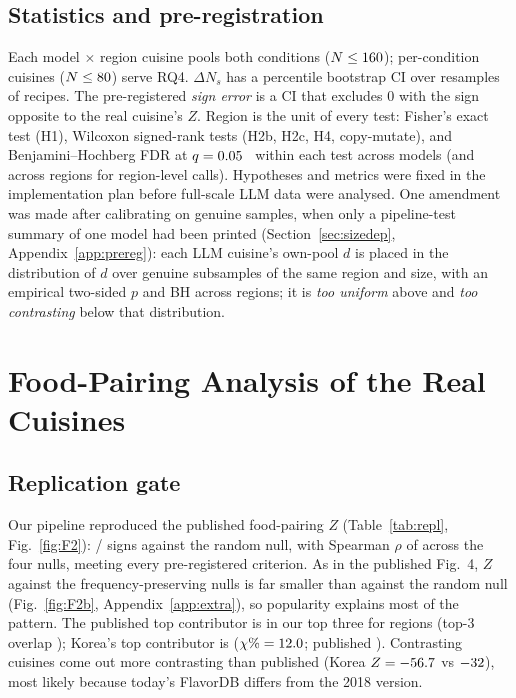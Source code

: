 \documentclass[conference]{IEEEtran}
\newcommand{\dNs}{\Delta N_s}
\begin{document}
\subsection{Statistics and pre-registration}\label{sec:stats}
Each model $\times$ region cuisine pools both conditions ($N\leq160$); per-condition cuisines ($N\leq80$) serve RQ4. $\dNs$ has a percentile bootstrap CI over \NBoot{} resamples of recipes. The pre-registered \emph{sign error} is a CI that excludes 0 with the sign opposite to the real cuisine's $Z$. Region is the unit of every test: Fisher's exact test (H1), Wilcoxon signed-rank tests (H2b, H2c, H4, copy-mutate), and Benjamini--Hochberg FDR at $q=0.05$~\cite{benjamini1995} within each test across models (and across regions for region-level calls). Hypotheses and metrics were fixed in the implementation plan before full-scale LLM data were analysed. One amendment was made after calibrating on genuine samples, when only a pipeline-test summary of one model had been printed (Section~\ref{sec:sizedep}, Appendix~\ref{app:prereg}): each LLM cuisine's own-pool $d$ is placed in the distribution of $d$ over genuine subsamples of the same region and size, with an empirical two-sided $p$ and BH across regions; it is \emph{too uniform} above and \emph{too contrasting} below that distribution.

\section{Food-Pairing Analysis of the Real Cuisines}
\subsection{Replication gate}
Our pipeline reproduced the published food-pairing $Z$ (Table~\ref{tab:repl}, Fig.~\ref{fig:F2}): \NReplRandomSigns/\NReplRandomN{} signs against the random null, with Spearman $\rho$ of \NReplRhoRange{} across the four nulls, meeting every pre-registered criterion. As in the published Fig.~4, $Z$ against the frequency-preserving nulls is far smaller than against the random null (Fig.~\ref{fig:F2b}, Appendix~\ref{app:extra}), so popularity explains most of the pattern. The published top contributor is in our top three for \NContribTopOne{} regions (top-3 overlap \NContribTopThree); Korea's top contributor is \NKoreaTopOne{} ($\chi\%=12.0$; published \NKoreaTopOnePub). Contrasting cuisines come out more contrasting than published (Korea $Z=-56.7$ vs $-32$), most likely because today's FlavorDB differs from the 2018 version.
\end{document}
